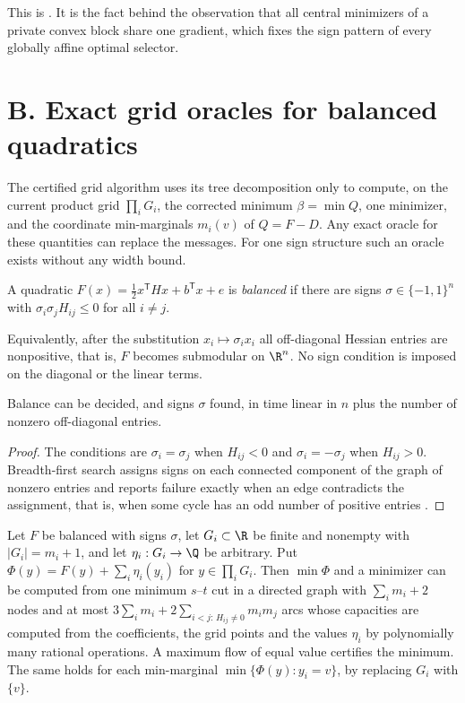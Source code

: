 \begin{remark}
This is \cite[Lemma~1 and Corollary~1]{Mangasarian1988}. It is the fact behind the observation
that all central minimizers of a private convex block share one gradient, which fixes the
sign pattern of every globally affine optimal selector.
\end{remark}

\section*{B. Exact grid oracles for balanced quadratics}

The certified grid algorithm uses its tree decomposition only to compute, on the current product
grid $\prod_iG_i$, the corrected minimum $\beta=\min Q$, one minimizer, and the coordinate
min-marginals $m_i(v)$ of $Q=F-D$. Any exact oracle for these quantities can replace the
messages. For one sign structure such an oracle exists without any width bound.

\begin{definition}
A quadratic $F(x)=\tfrac12x^{\mathsf T}Hx+b^{\mathsf T}x+e$ is \emph{balanced} if there are signs
$\sigma\in\{-1,1\}^n$ with $\sigma_i\sigma_jH_{ij}\le0$ for all $i\neq j$.
\end{definition}

Equivalently, after the substitution $x_i\mapsto\sigma_ix_i$ all off-diagonal Hessian entries
are nonpositive, that is, $F$ becomes submodular on $\R^n$. No sign condition is imposed on the
diagonal or the linear terms.

\begin{lemma}\label{lit:lem:balance}
Balance can be decided, and signs $\sigma$ found, in time linear in $n$ plus the number of
nonzero off-diagonal entries.
\end{lemma}

\begin{proof}
The conditions are $\sigma_i=\sigma_j$ when $H_{ij}<0$ and $\sigma_i=-\sigma_j$ when $H_{ij}>0$.
Breadth-first search assigns signs on each connected component of the graph of nonzero entries
and reports failure exactly when an edge contradicts the assignment, that is, when some cycle has
an odd number of positive entries \cite{Harary1953}.
\end{proof}

\begin{lemma}\label{lit:lem:chaincut}
Let $F$ be balanced with signs $\sigma$, let $G_i\subset\R$ be finite and nonempty with
$|G_i|=m_i+1$, and let $\eta_i:G_i\to\Q$ be arbitrary. Put
$\Phi(y)=F(y)+\sum_i\eta_i(y_i)$ for $y\in\prod_iG_i$. Then $\min\Phi$ and a minimizer can be
computed from one minimum $s$--$t$ cut in a directed graph with $\sum_im_i+2$ nodes and at most
$3\sum_im_i+2\sum_{i<j:\,H_{ij}\neq0}m_im_j$ arcs whose capacities are computed from the
coefficients, the grid points and the values $\eta_i$ by polynomially many rational operations.
A maximum flow of equal value certifies the minimum. The same
holds for each min-marginal $\min\{\Phi(y):y_i=v\}$, by replacing $G_i$ with $\{v\}$.
\end{lemma}


